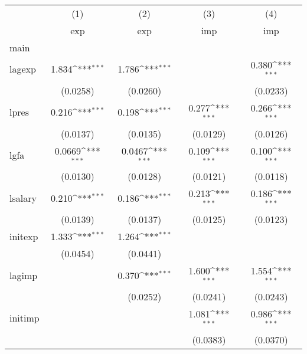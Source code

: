 {
\def\sym#1{\ifmmode^{#1}\else\(^{#1}\)\fi}
\begin{tabular}{l*{4}{c}}
\hline\hline
            &\multicolumn{1}{c}{(1)}&\multicolumn{1}{c}{(2)}&\multicolumn{1}{c}{(3)}&\multicolumn{1}{c}{(4)}\\
            &\multicolumn{1}{c}{exp}&\multicolumn{1}{c}{exp}&\multicolumn{1}{c}{imp}&\multicolumn{1}{c}{imp}\\
\hline
main        &                     &                     &                     &                     \\
lagexp      &       1.834\sym{***}&       1.786\sym{***}&                     &       0.380\sym{***}\\
            &    (0.0258)         &    (0.0260)         &                     &    (0.0233)         \\
[1em]
lpres       &       0.216\sym{***}&       0.198\sym{***}&       0.277\sym{***}&       0.266\sym{***}\\
            &    (0.0137)         &    (0.0135)         &    (0.0129)         &    (0.0126)         \\
[1em]
lgfa        &      0.0669\sym{***}&      0.0467\sym{***}&       0.109\sym{***}&       0.100\sym{***}\\
            &    (0.0130)         &    (0.0128)         &    (0.0121)         &    (0.0118)         \\
[1em]
lsalary     &       0.210\sym{***}&       0.186\sym{***}&       0.213\sym{***}&       0.186\sym{***}\\
            &    (0.0139)         &    (0.0137)         &    (0.0125)         &    (0.0123)         \\
[1em]
initexp     &       1.333\sym{***}&       1.264\sym{***}&                     &                     \\
            &    (0.0454)         &    (0.0441)         &                     &                     \\
[1em]
lagimp      &                     &       0.370\sym{***}&       1.600\sym{***}&       1.554\sym{***}\\
            &                     &    (0.0252)         &    (0.0241)         &    (0.0243)         \\
[1em]
initimp     &                     &                     &       1.081\sym{***}&       0.986\sym{***}\\
            &                     &                     &    (0.0383)         &    (0.0370)         \\

\end{tabular}}
